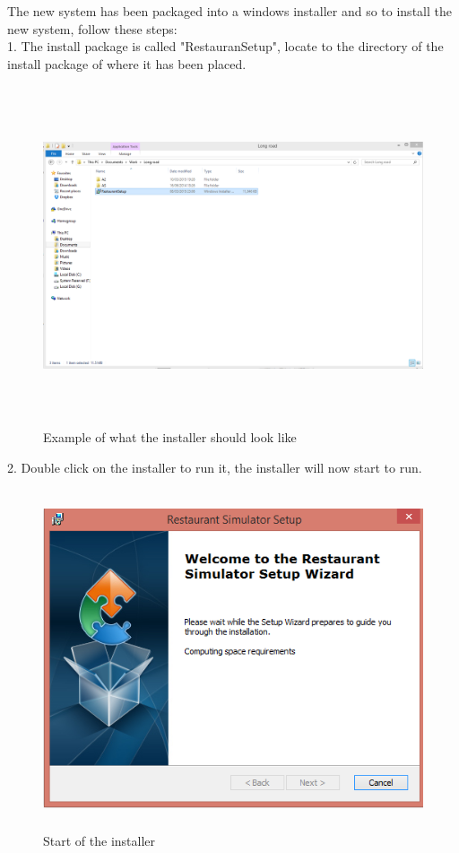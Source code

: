 \begin{landscape}
The new system has been packaged into a windows installer and so to install the new system, follow these steps: \\
1. The install package is called "RestauranSetup", locate to the directory of the install package of where it has been placed. 

\begin{figure}[H]
    \includegraphics[height = 10cm]{./Manual/images/install1} 
    \caption{Example of what the installer should look like} \label{fig:install1}
\end{figure}


2. Double click on the installer to run it, the installer will now start to run.

\begin{figure}[H]
    \includegraphics[height = 10cm]{./Manual/images/install2} 
    \caption{Start of the installer} \label{fig:install2}
\end{figure}


\end{landscape}
